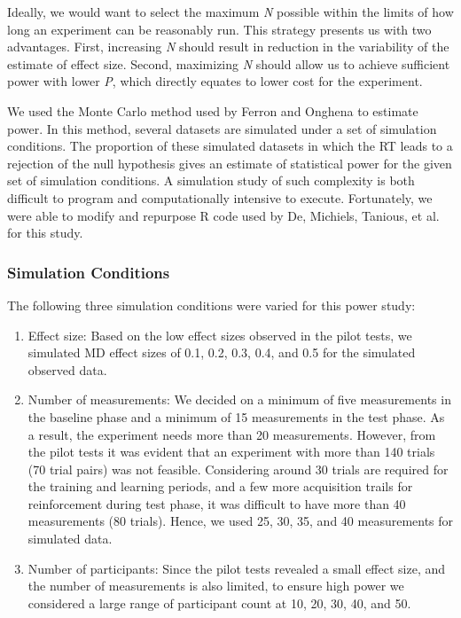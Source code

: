 \documentclass{article}
\begin{document}
Ideally, we would want to select the maximum \emph{N} possible within the limits of how long an experiment can be reasonably run. This strategy presents us with two advantages. First, increasing \emph{N} should result in reduction in the variability of the estimate of effect size. Second, maximizing \emph{N} should allow us to achieve sufficient power with lower \emph{P}, which directly equates to lower cost for the experiment.

We used the Monte Carlo method used by Ferron and Onghena \autocite{bib19} to estimate power. In this method, several datasets are simulated under a set of simulation conditions. The proportion of these simulated datasets in which the RT leads to a rejection of the null hypothesis gives an estimate of statistical power for the given set of simulation conditions. A simulation study of such complexity is both difficult to program and computationally intensive to execute. Fortunately, we were able to modify and repurpose R code used by De, Michiels, Tanious, et al. \autocite{bib39} for this study. 

\subsubsection{Simulation Conditions} 

The following three simulation conditions were varied for this power study:


\begin{enumerate}

  \item Effect size: Based on the low effect sizes observed in the pilot tests, we simulated MD effect sizes of 0.1, 0.2, 0.3, 0.4, and 0.5 for the simulated observed data.

 
  \item Number of measurements: We decided on a minimum of five measurements in the baseline phase and a minimum of 15 measurements in the test phase. As a result, the experiment needs more than 20 measurements. However, from the pilot tests it was evident that an experiment with more than 140 trials (70 trial pairs) was not feasible. Considering around 30 trials are required for the training and learning periods, and a few more acquisition trails for reinforcement during test phase, it was difficult to have more than 40 measurements (80 trials). Hence, we used 25, 30, 35, and 40 measurements for simulated data. 


  \item Number of participants: Since the pilot tests revealed a small effect size, and the number of measurements is also limited, to ensure high power we considered a large range of participant count at 10, 20, 30, 40, and 50. 


  

\end{enumerate}
\end{document}
